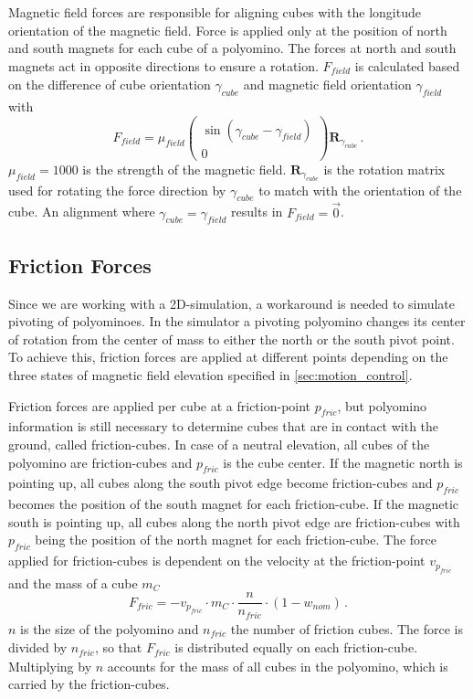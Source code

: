 Magnetic field forces are responsible for aligning cubes with the longitude orientation of the magnetic field.
Force is applied only at the position of north and south magnets for each cube of a polyomino.
The forces at north and south magnets act in opposite directions to ensure a rotation.
$F_\textit{field}$ is calculated based on the difference of cube orientation $\gamma_\textit{cube}$ and magnetic field orientation $\gamma_\textit{field}$ with
\begin{equation}
F_\textit{field} = \mu_\textit{field} \begin{pmatrix} \sin(\gamma_\textit{cube} - \gamma_\textit{field}) \\ 0 \end{pmatrix} \mathbf{R}_{\gamma_\textit{cube}} \, .
\end{equation}
$\mu_\textit{field} = 1000$ is the strength of the magnetic field.
$\mathbf{R}_{\gamma_\textit{cube}}$ is the rotation matrix used for rotating the force direction by $\gamma_\textit{cube}$ to match with the orientation of the cube.
An alignment where $\gamma_\textit{cube} = \gamma_\textit{field}$ results in $F_\textit{field} = \vec{0}$.


\subsection{Friction Forces}
\label{sec:force_friction}

Since we are working with a 2D-simulation, a workaround is needed to simulate pivoting of polyominoes.
In the simulator a pivoting polyomino changes its center of rotation from the center of mass to either the north or the south pivot point.
To achieve this, friction forces are applied at different points depending on the three states of magnetic field elevation specified in \autoref{sec:motion_control}.

Friction forces are applied per cube at a friction-point $p_\textit{fric}$, but polyomino information is still necessary to determine cubes that are in contact with the ground, called friction-cubes.
In case of a neutral elevation, all cubes of the polyomino are friction-cubes and $p_\textit{fric}$ is the cube center.
If the magnetic north is pointing up, all cubes along the south pivot edge become friction-cubes and $p_\textit{fric}$ becomes the position of the south magnet for each friction-cube.
If the magnetic south is pointing up, all cubes along the north pivot edge are friction-cubes with $p_\textit{fric}$ being the position of the north magnet for each friction-cube.
The force applied for friction-cubes is dependent on the velocity at the friction-point $v_{p_\textit{fric}}$ and the mass of a cube $m_C$
\begin{equation}
F_\textit{fric} = -v_{p_\textit{fric}} \cdot m_C \cdot \frac{n}{n_\textit{fric}} \cdot (1 - w_\textit{nom})\, .
\end{equation}
$n$ is the size of the polyomino and $n_\textit{fric}$ the number of friction cubes.
The force is divided by $n_\textit{fric}$, so that $F_\textit{fric}$ is distributed equally on each friction-cube.
Multiplying by $n$ accounts for the mass of all cubes in the polyomino, which is carried by the friction-cubes.

